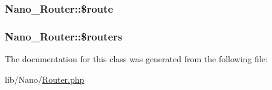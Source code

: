 \hypertarget{classNano__Router_7fbe7706ca263930621c755b1a5327c0}{
\subsubsection[{\$route}]{\setlength{\rightskip}{0pt plus 5cm}Nano\_\-Router::\$route}}
\label{classNano__Router_7fbe7706ca263930621c755b1a5327c0}


\hypertarget{classNano__Router_0ab90a3362c48e85cb312721aa93fe92}{
\subsubsection[{\$routers}]{\setlength{\rightskip}{0pt plus 5cm}Nano\_\-Router::\$routers}}
\label{classNano__Router_0ab90a3362c48e85cb312721aa93fe92}




The documentation for this class was generated from the following file:\begin{CompactItemize}
\item 
lib/Nano/\hyperlink{Router_8php}{Router.php}\end{CompactItemize}

